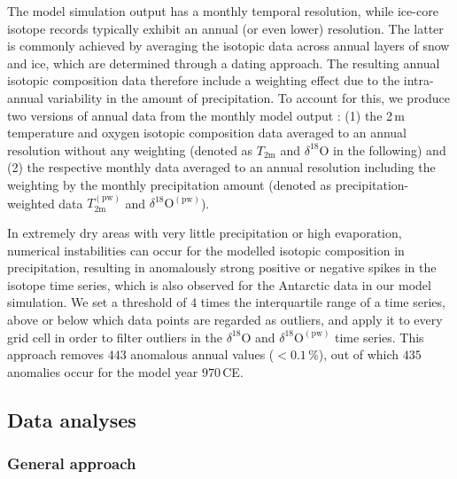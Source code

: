 \documentclass[cp]{copernicus}
\begin{document}
The model simulation output has a monthly temporal resolution, while ice-core
isotope records typically exhibit an annual (or even lower) resolution. The
latter is commonly achieved by averaging the isotopic data across annual layers
of snow and ice, which are determined through a dating approach. The resulting
annual isotopic composition data therefore include a weighting effect due to the
intra-annual variability in the amount of precipitation. To account for this, we
produce two versions of annual data from the monthly model output
\citep{Munch2020}: (1) the 2\,m temperature and oxygen isotopic composition data
averaged to an annual resolution without any weighting (denoted as
$T_{2\mathrm{m}}$ and $\delta^{18}\mathrm{O}$ in the following) and (2) the
respective monthly data averaged to an annual resolution including the weighting
by the monthly precipitation amount (denoted as precipitation-weighted data
$T_{2\mathrm{m}}^{\mathrm{(pw)}}$ and $\delta^{18}\mathrm{O}^{\mathrm{(pw)}}$).

In extremely dry areas with very little precipitation or high evaporation,
numerical instabilities can occur for the modelled isotopic composition in
precipitation, resulting in anomalously strong positive or negative spikes in
the isotope time series, which is also observed for the Antarctic data in our
model simulation. We set a threshold of $4$ times the interquartile range of a
time series, above or below which data points are regarded as outliers, and
apply it to every grid cell in order to filter outliers in the
$\delta^{18}\mathrm{O}$ and $\delta^{18}\mathrm{O}^{\mathrm{(pw)}}$ time
series. This approach removes $443$ anomalous annual values ($<0.1$\,\%), out of
which $435$ anomalies occur for the model year $970$\,CE.

\subsection{Data analyses}\label{methods:main}

\subsubsection{General approach}\label{methods:general}
\end{document}
